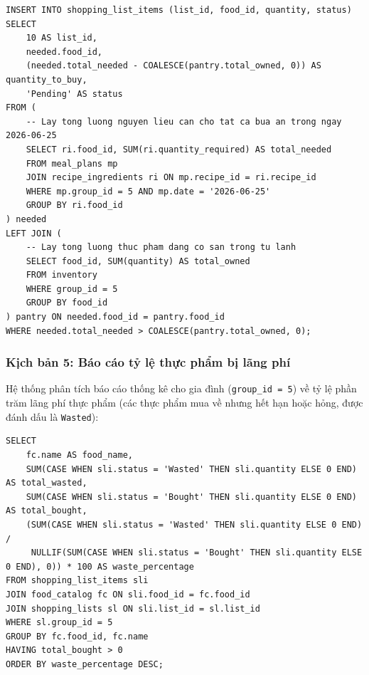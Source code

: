 \documentclass[../main.tex]{subfiles}
\begin{document}
\begin{lstlisting}[style=mysqlstyle, caption=Insert Missing Ingredients from Meal Plan to Shopping List]
INSERT INTO shopping_list_items (list_id, food_id, quantity, status)
SELECT 
    10 AS list_id,
    needed.food_id,
    (needed.total_needed - COALESCE(pantry.total_owned, 0)) AS quantity_to_buy,
    'Pending' AS status
FROM (
    -- Lay tong luong nguyen lieu can cho tat ca bua an trong ngay 2026-06-25
    SELECT ri.food_id, SUM(ri.quantity_required) AS total_needed
    FROM meal_plans mp
    JOIN recipe_ingredients ri ON mp.recipe_id = ri.recipe_id
    WHERE mp.group_id = 5 AND mp.date = '2026-06-25'
    GROUP BY ri.food_id
) needed
LEFT JOIN (
    -- Lay tong luong thuc pham dang co san trong tu lanh
    SELECT food_id, SUM(quantity) AS total_owned
    FROM inventory
    WHERE group_id = 5
    GROUP BY food_id
) pantry ON needed.food_id = pantry.food_id
WHERE needed.total_needed > COALESCE(pantry.total_owned, 0);
\end{lstlisting}

\subsubsection{Kịch bản 5: Báo cáo tỷ lệ thực phẩm bị lãng phí}
Hệ thống phân tích báo cáo thống kê cho gia đình (\texttt{group\_id = 5}) về tỷ lệ phần trăm lãng phí thực phẩm (các thực phẩm mua về nhưng hết hạn hoặc hỏng, được đánh dấu là \texttt{Wasted}):

\begin{lstlisting}[style=mysqlstyle, caption=SQL Query for Consumption Waste Report]
SELECT 
    fc.name AS food_name,
    SUM(CASE WHEN sli.status = 'Wasted' THEN sli.quantity ELSE 0 END) AS total_wasted,
    SUM(CASE WHEN sli.status = 'Bought' THEN sli.quantity ELSE 0 END) AS total_bought,
    (SUM(CASE WHEN sli.status = 'Wasted' THEN sli.quantity ELSE 0 END) / 
     NULLIF(SUM(CASE WHEN sli.status = 'Bought' THEN sli.quantity ELSE 0 END), 0)) * 100 AS waste_percentage
FROM shopping_list_items sli
JOIN food_catalog fc ON sli.food_id = fc.food_id
JOIN shopping_lists sl ON sli.list_id = sl.list_id
WHERE sl.group_id = 5
GROUP BY fc.food_id, fc.name
HAVING total_bought > 0
ORDER BY waste_percentage DESC;
\end{lstlisting}
\end{document}
